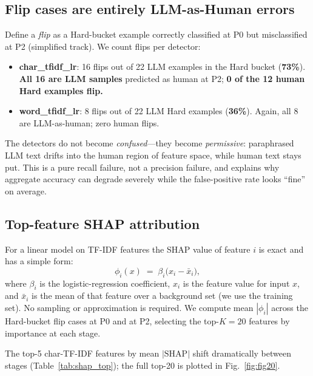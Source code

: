 \documentclass[11pt,a4paper]{article}
\begin{document}
\subsection{Flip cases are entirely LLM-as-Human errors}

Define a \emph{flip} as a Hard-bucket example correctly classified at P0
but misclassified at P2 (simplified track). We count flips per detector:

\begin{itemize}
\item \textbf{char\_tfidf\_lr}: 16 flips out of 22 LLM examples in the Hard
bucket (\textbf{73\%}).
\textbf{All 16 are LLM samples} predicted as human at P2; \textbf{0 of the
12 human Hard examples flip.}
\item \textbf{word\_tfidf\_lr}: 8 flips out of 22 LLM Hard examples (\textbf{36\%}).
Again, all 8 are LLM-as-human; zero human flips.
\end{itemize}

The detectors do not become \emph{confused}—they become \emph{permissive}:
paraphrased LLM text drifts into the human region of feature space, while
human text stays put. This is a pure recall failure, not a precision failure,
and explains why aggregate accuracy can degrade severely while the false-positive
rate looks ``fine'' on average.

\FloatBarrier
\subsection{Top-feature SHAP attribution}
For a linear model on TF-IDF features the SHAP value of feature $i$ is exact
and has a simple form:
\begin{equation}
  \phi_i(x) \;=\; \beta_i \bigl(x_i - \bar{x}_i\bigr),
  \label{eq:shap}
\end{equation}
where $\beta_i$ is the logistic-regression coefficient, $x_i$ is the
feature value for input $x$, and $\bar{x}_i$ is the mean of that feature
over a background set (we use the training set). No sampling or
approximation is required. We compute mean $|\phi_i|$ across the
Hard-bucket flip cases at P0 and at P2, selecting the top-$K{=}20$
features by importance at each stage.

The top-5 char-TF-IDF features by mean $|\text{SHAP}|$ shift dramatically
between stages (Table~\ref{tab:shap_top}); the full top-20 is plotted in
Fig.~\ref{fig:fig20}.
\end{document}
